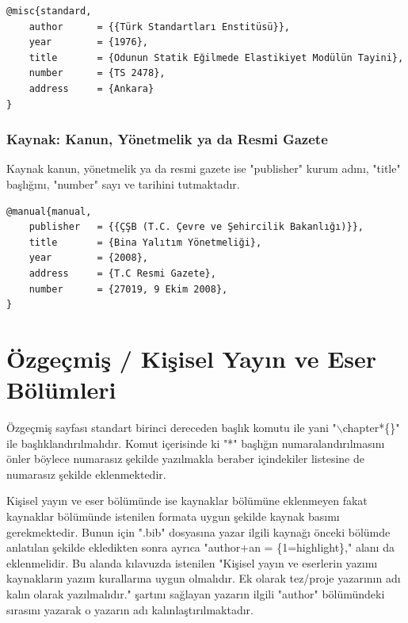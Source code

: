 \begin{lstlisting}[language={[LaTeX]{TeX}}, label=bib:standart, caption=Kaynak standart ise]
@misc{standard,
	author		= {{Türk Standartları Enstitüsü}},
	year		= {1976},
	title		= {Odunun Statik Eğilmede Elastikiyet Modülün Tayini},
	number 		= {TS 2478},
	address     = {Ankara}
}
\end{lstlisting}

\subsection{Kaynak: Kanun, Yönetmelik ya da Resmi Gazete}

Kaynak kanun, yönetmelik ya da resmi gazete ise "publisher" kurum adını, "title" başlığını, "number" sayı ve tarihini tutmaktadır.

\begin{lstlisting}[language={[LaTeX]{TeX}}, label=bib:kanun, caption={Kaynak kanun, yönetmelik ya da resmi gazete ise}]
@manual{manual,
	publisher   = {{ÇŞB (T.C. Çevre ve Şehircilik Bakanlığı)}},
	title 		= {Bina Yalıtım Yönetmeliği},
	year		= {2008},
	address		= {T.C Resmi Gazete},
	number		= {27019, 9 Ekim 2008},	
}
\end{lstlisting}


\chapter{Özgeçmiş / Kişisel Yayın ve Eser Bölümleri }
\label{ch:ozgec}
Özgeçmiş sayfası standart birinci dereceden başlık komutu ile yani "$\backslash$chapter*\{\}" ile başlıklandırılmalıdır. Komut içerisinde ki "*" başlığın numaralandırılmasını önler böylece numarasız şekilde yazılmakla beraber içindekiler listesine de numarasız şekilde eklenmektedir.

Kişisel yayın ve eser bölümünde ise kaynaklar bölümüne eklenmeyen fakat kaynaklar bölümünde istenilen formata uygun şekilde kaynak basımı gerekmektedir. Bunun için ".bib" dosyasına yazar ilgili kaynağı önceki bölümde anlatılan şekilde ekledikten sonra ayrıca "author+an = \{1=highlight\}," alanı da eklenmelidir. Bu alanda kılavuzda istenilen "Kişisel yayın ve eserlerin yazımı kaynakların yazım kurallarına uygun olmalıdır. Ek olarak tez/proje yazarının adı kalın olarak yazılmalıdır." şartını sağlayan yazarın ilgili "author" bölümündeki sırasını yazarak o yazarın adı kalınlaştırılmaktadır.


